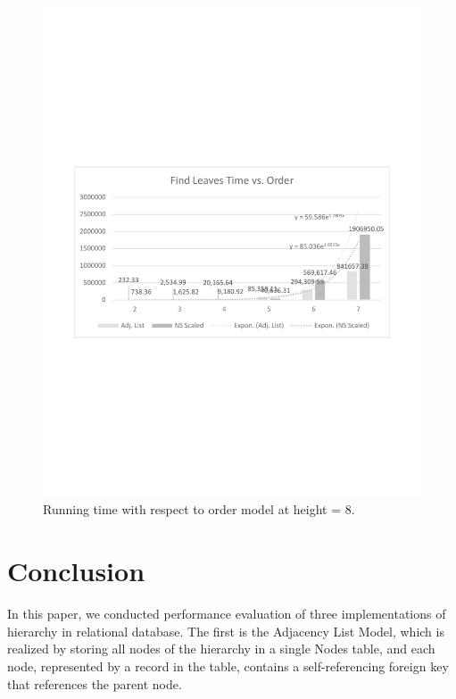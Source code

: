 \begin{figure}[!h]
\begin{center}
\includegraphics[width=6in]{images/eval/leaves/order/col_trend.pdf}
\caption{Running time with respect to order model at height = 8.\label{fig-leaves-order2}}
\end{center}
\end{figure}

\section{Conclusion}\label{sec_conclusion}

In this paper, we conducted performance evaluation of three implementations of hierarchy in relational database. The first is the Adjacency List Model, which is realized by storing all nodes of the hierarchy in a single Nodes table, and each node, represented by a record in the table, contains a self-referencing foreign key that references the parent node.

